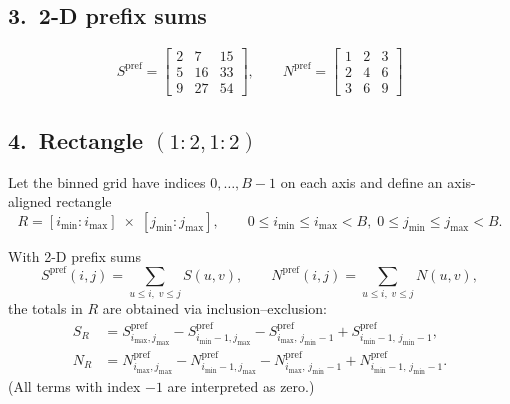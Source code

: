 \documentclass{article}
\begin{document}
\subsection*{3.~2-D prefix sums}
\[
  S^{\text{pref}}=\begin{bmatrix}
      2 & 7 & 15\\
      5 & 16& 33\\
      9 & 27& 54
  \end{bmatrix},
\qquad
  N^{\text{pref}}=\begin{bmatrix}
      1 & 2 & 3\\
      2 & 4 & 6\\
      3 & 6 & 9
  \end{bmatrix}
\]

\subsection*{4.~Rectangle \((1{:}2,1{:}2)\)}


Let the binned grid have indices \(0,\dots,B-1\) on each axis and define an
axis-aligned rectangle
\[
  R=[i_{\min}\!:\!i_{\max}]\;\times\;[j_{\min}\!:\!j_{\max}],
  \qquad
  0\le i_{\min}\le i_{\max}<B,\;
  0\le j_{\min}\le j_{\max}<B .
\]

With 2-D prefix sums
\[
  S^{\mathrm{pref}}(i,j)=\!\!\!\sum_{u\le i,\;v\le j}\!S(u,v),
  \qquad
  N^{\mathrm{pref}}(i,j)=\!\!\!\sum_{u\le i,\;v\le j}\!N(u,v),
\]
the totals in \(R\) are obtained via inclusion–exclusion:
\begin{equation}
\boxed{
\begin{aligned}
  S_R &= S^{\mathrm{pref}}_{i_{\max},j_{\max}}
         -S^{\mathrm{pref}}_{i_{\min}-1,j_{\max}}
         -S^{\mathrm{pref}}_{i_{\max},\,j_{\min}-1}
         +S^{\mathrm{pref}}_{i_{\min}-1,\,j_{\min}-1},\\[4pt]
  N_R &= N^{\mathrm{pref}}_{i_{\max},j_{\max}}
         -N^{\mathrm{pref}}_{i_{\min}-1,j_{\max}}
         -N^{\mathrm{pref}}_{i_{\max},\,j_{\min}-1}
         +N^{\mathrm{pref}}_{i_{\min}-1,\,j_{\min}-1}.
\end{aligned}}
\label{eq:2D-inc-exc}
\end{equation}
(All terms with index \(-1\) are interpreted as zero.)
\end{document}
